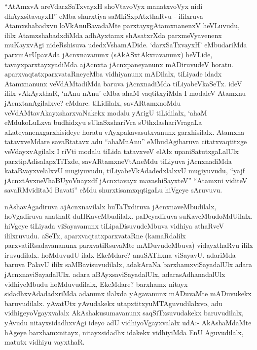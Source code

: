 \begin{artha}
``AtAmxvA areVdarxSaTxvayxH shoVtavoVyx manatxvoVyx nidi dhAyxsitavayxH'' eMba \-shurxtiya saMkiSxpAtxthaRvu -
ililxruva Atamxshabadxvu loVkAnuBavadaMte parxtayxgAtamxnanenxV
heVLu\-vudu, ililx AtamxshabadxdiMda adhAyxtamx shAsatxrXda
parxmeVyavenenx muKayxvAgi nideRshisuva udedxVshamADide. `darxSaTxvayxH'
eMbudariMda parxmArUpavAda jAcnxnavanunx \break (sAkASxtAkxravanunx) heVLide,
tavayxparxtayxyadiMda ajAcnxta jAcnxpaneyanunx mADiruvudeV
horatu. aparxvaqtatxparxvataRneyeMba vidhiyanunx mADilalx, tiLiyade
idadx Atamx\-nanunx veVdAMtadiMda baruva jAcnxnadiMda
tiLiyabeVkaSeTx. ideV ililx vAkAyxthaR, `nAnu nAnu' eMba ahaM
vaqtitxyiMda I modaleV Atamxnu jAcnxtanAgilalxve? \-eMdare. tiLidilalx,
savARtamxnoMdu veVdAMtavAkayxsharxvaNakekx modalu yArigU tiLidilalx,
`ahaM eMdukoLuLxva budhidxyu sUkaSxshariVra sUthxlashariVragaLa
aLateyanenx\-garxhisideye horatu vAyxpakavasutxvanunx
garxhisilalx. Atamxna tatavxveMdare savaRtatavx adu ``ahaMnAnu''
eMbudAgibaruva citatxvaqtitxge veVdayxvAgilalx I riVti
modalu tiLida tatavxveV elAlx upaniSatutxgaLalUlx
parxtipAdisalapxTiTxde, savARtamxneVtAneMdu tiLiyuva jAcnxnadiMda
kataRvayxvelalxvU mugiyuvudu, tiLiyabeVkAdadedxlalxvU mugiyuvudu,
``yajf jAcnxtAvxneVhaBUyoV\s nayxdf jAcnxtavayx mavashiSayxteV'' ``Atamxni viditeV savaRMviditaM Bavati'' eMdu shurxtisamxqqtigaLu hiVgeye sAruvuvu.
\end{artha}

\centerline{}

\begin{artha}
nAshavAgadiruva ajAcnxnavilalx huTaTxdiruva jAcnxnaveMbudilalx,
hoVgadiruva \break anathaR duHKaveMbudilalx. paDeyadiruva
suKaveMbudoMdUilalx. hiVgeye tiLiyada viSayavanunx tiLipaDisuvudeMbuva
vidhiya athaRveV ililxruvudu. aSeTx, aparxvaqtatxparxvataRne
(kamaRdalilx parxvatiRsadavananunx parxvatiRsuvaMte mADuvu\break deMbuva)
vidayxthaRvu ililx iruvudilalx. hoMduvudU ilalx EkeMdare? anuSAThxna
viSayavU. adariMda baruva PalavU ililx saMBavisuvudilalx, adakAraNa
barxhamx\break viSayadalUlx adara jAcnxnaviSayadalUlx. adara
aBAyxsaviSayadalUlx, adarasAdhana\-dalUlx vidhiyeMbudu hoMduvudilalx,
EkeMdare? barxhamx nitayx sidadhxvAdadadxriMda adanunx ilalxda
yAgavanunx mADuvaMte mADuvukekx baruvudilalx. yAvatUtx \break yAvudakekx
utapxtitxyuMTAguvudilalxvo, adu vidhigeyoVgayxvalalx
AkAshakusumavanunx saqSiTxsuvudakekx baruvudilalx, yAvudu
nitayxsidadhxvAgi ideyo adU vidhi\-yoVgayxvalalx udA:- AkAshaMdaMte
hAgeye barxhamxnitayx, nitayxsidadhx idakekx vidhiyiMda EnU
Aguvudilalx, matutx vidhiyu vayxthaR. 
\end{artha}

